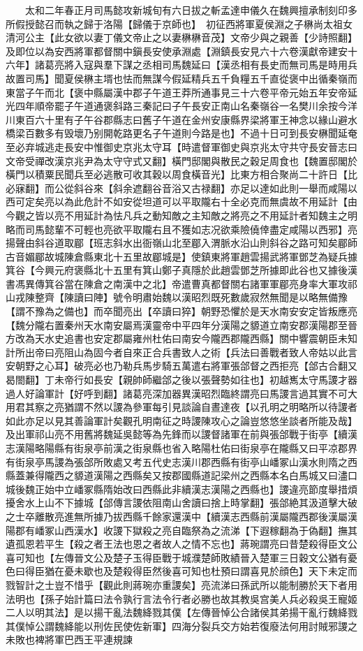 　　太和二年春正月司馬懿攻新城旬有六日拔之斬孟達申儀久在魏興擅承制刻印多所假授懿召而執之歸于洛陽【歸儀于京師也】　初征西將軍夏侯淵之子楙尚太祖女清河公主【此女欲以妻丁儀文帝止之以妻楙楙音茂】文帝少與之親善【少詩照翻】及即位以為安西將軍都督關中鎭長安使承淵處【淵鎮長安見六十六卷漢獻帝建安十六年】諸葛亮將入寇與羣下謀之丞相司馬魏延曰【漢丞相有長史而無司馬是時用兵故置司馬】聞夏侯楙主壻也怯而無謀今假延精兵五千負糧五千直從褒中出循秦嶺而東當子午而北【褒中縣屬漢中郡子午道王莽所通事見三十六卷平帝元始五年安帝延光四年順帝罷子午道通褒斜路三秦記曰子午長安正南山名秦嶺谷一名樊川余按今洋川東百六十里有子午谷郡縣志曰舊子午道在金州安康縣界梁將軍王神念以緣山避水橋梁百數多有毁壞乃别開乾路更名子午道則今路是也】不過十日可到長安楙聞延奄至必弃城逃走長安中惟御史京兆太守耳【時遣督軍御史與京兆太守共守長安晉志曰文帝受禪改漢京兆尹為太守守式又翻】橫門邸閣與散民之穀足周食也【魏置邸閣於橫門以積粟民聞兵至必逃散可收其穀以周食橫音光】比東方相合聚尚二十許日【比必寐翻】而公從斜谷來【斜余遮翻谷音浴又古禄翻】亦足以達如此則一舉而咸陽以西可定矣亮以為此危計不如安從坦道可以平取隴右十全必克而無虞故不用延計【由今觀之皆以亮不用延計為怯凡兵之動知敵之主知敵之將亮之不用延計者知魏主之明略而司馬懿輩不可輕也亮欲平取隴右且不獲如志况欲乘險僥倖盡定咸陽以西邪】亮揚聲由斜谷道取郿【班志斜水出衙嶺山北至郿入渭脈水沿山則斜谷之路可知矣郿師古音媚郿故城陳倉縣東北十五里故郿城是】使鎮東將軍趙雲揚武將軍鄧芝為疑兵據箕谷【今興元府褒縣北十五里有箕山鄭子真隱於此趙雲鄧芝所據即此谷也又據後漢書馮異傳箕谷當在陳倉之南漢中之北】帝遣曹真都督關右諸軍軍郿亮身率大軍攻祁山戎陳整齊【陳讀曰陣】號令明肅始魏以漢昭烈既死數歲寂然無聞是以略無備豫【謂不豫為之備也】而卒聞亮出【卒讀曰猝】朝野恐懼於是天水南安安定皆叛應亮【魏分隴右置秦州天水南安屬焉漢靈帝中平四年分漢陽之䝠道立南安郡漢陽郡至晉方改為天水史追書也安定郡屬雍州杜佑曰南安今隴西郡隴西縣】關中響震朝臣未知計所出帝曰亮阻山為固今者自來正合兵書致人之術【兵法曰善戰者致人帝姑以此言安朝野之心耳】破亮必也乃勒兵馬步騎五萬遣右將軍張郃督之西拒亮【郃古合翻又曷閤翻】丁未帝行如長安【親帥師繼郃之後以張聲勢如往也】初越嶲太守馬謖才器過人好論軍計【好呼到翻】諸葛亮深加器異漢昭烈臨終謂亮曰馬謖言過其實不可大用君其察之亮猶謂不然以謖為參軍每引見談論自晝達夜【以孔明之明略所以待謖者如此亦足以見其善論軍計矣觀孔明南征之時謖陳攻心之論豈悠悠坐談者所能及哉】及出軍祁山亮不用舊將魏延吳懿等為先鋒而以謖督諸軍在前與張郃戰于街亭【續漢志漢陽略陽縣有街泉亭前漢之街泉縣也省入略陽杜佑曰街泉亭在隴縣又曰平凉郡界有街泉亭馬謖為張郃所敗處又考五代史志漢川郡西縣有街亭山嶓冢山漢水則隋之西縣蓋兼得隴西之䝠道漢陽之西縣矣又按郡國縣道記梁州之西縣本名白馬城又曰濜口城後魏正始中立嶓冢縣隋始改曰西縣此非續漢志漢陽之西縣也】謖違亮節度舉措煩擾舍水上山不下據城【郃傳言謖依阻南山舍讀曰捨上時掌翻】張郃絶其汲道擊大破之士卒離散亮進無所據乃拔西縣千餘家還漢中【續漢志西縣前漢屬隴西郡後漢屬漢陽郡有嶓冢山西漢水】收謖下獄殺之亮自臨祭為之流涕【下遐稼翻為于偽翻】撫其遺孤恩若平生【殺之者王法也恩之者故人之情不忘也】蔣琬謂亮曰昔楚殺得臣文公喜可知也【左傳晉文公及楚子玉得臣戰于城濮楚師敗績晉入楚軍三日穀文公猶有憂色曰得臣猶在憂未歇也及楚殺得臣然後喜可知也杜預曰謂喜見於顔色】天下未定而戮智計之士豈不惜乎【觀此則蔣琬亦重謖矣】亮流涕曰孫武所以能制勝於天下者用法明也【孫子始計篇曰法令孰行言法令行者必勝也故其教吳宫美人兵必殺吳王寵姬二人以明其法】是以揚干亂法魏絳戮其僕【左傳晉悼公合諸侯其弟揚干亂行魏絳戮其僕悼公謂魏絳能以刑佐民使佐新軍】四海分裂兵交方始若復廢法何用討賊邪謖之未敗也裨將軍巴西王平連規諫